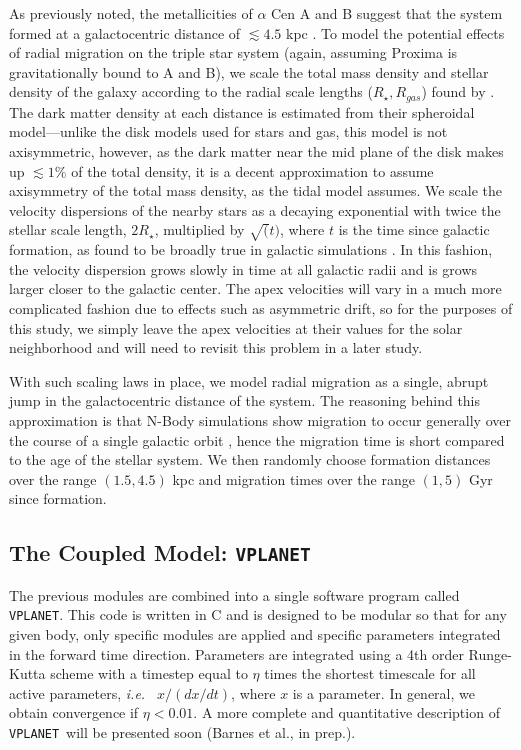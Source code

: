 \documentclass[preprint,12pt]{aastex}
\def\ie{{\it i.e.\ }}
\def\vplanet{\texttt{\footnotesize{VPLANET}}\xspace}
\begin{document}
As previously noted, the metallicities of $\alpha$ Cen A and B suggest
that the system formed at a galactocentric distance of $\lesssim 4.5$
kpc \citep{Loebman16}.  To model the potential effects of radial
migration on the triple star system (again, assuming Proxima is
gravitationally bound to A and B), we scale the total mass density and
stellar density of the galaxy according to the radial scale lengths
($R_{\star}, R_{gas}$) found by \cite{Kordopatis15}. The dark matter
density at each distance is estimated from their spheroidal
model---unlike the disk models used for stars and gas, this model is
not axisymmetric, however, as the dark matter near the mid plane of
the disk makes up $\lesssim 1\%$ of the total density, it is a decent
approximation to assume axisymmetry of the total mass density, as the
\cite{Heisler1986} tidal model assumes.  We scale the velocity
dispersions of the nearby stars as a decaying exponential with twice
the stellar scale length, $2R_{\star}$, multiplied by $\sqrt(t)$,
where $t$ is the time since galactic formation, as found to be broadly
true in galactic simulations \cite{Minchev2012, Roskar2012}. In this
fashion, the velocity dispersion grows slowly in time at all galactic
radii and is grows larger closer to the galactic center. The apex
velocities will vary in a much more complicated fashion due to effects
such as asymmetric drift, so for the purposes of this study, we simply
leave the apex velocities at their values for the solar neighborhood
and will need to revisit this problem in a later study.

With such scaling laws in place, we model radial migration as a
single, abrupt jump in the galactocentric distance of the system. The
reasoning behind this approximation is that N-Body simulations show
migration to occur generally over the course of a single galactic
orbit \cite{Roskar2010}, hence the migration time is short compared to
the age of the stellar system.  We then randomly choose formation
distances over the range $(1.5,4.5)$ kpc and migration times over the
range $(1,5)$ Gyr since formation.

\subsection{The Coupled Model: \vplanet}
\label{sec:models:vplanet}
The previous modules are combined into a single software program
called \vplanet. This code is written in C and is designed to be
modular so that for any given body, only specific modules are applied
and specific parameters integrated in the forward time direction. 
Parameters are integrated
using a 4th order Runge-Kutta scheme with a timestep equal to $\eta$
times the shortest timescale for all active parameters, \ie
$x/(dx/dt)$, where $x$ is a parameter. In general, we obtain convergence if
$\eta < 0.01$. A more complete and quantitative description of
\vplanet~will be presented soon (Barnes et al., in prep.). 
\end{document}

